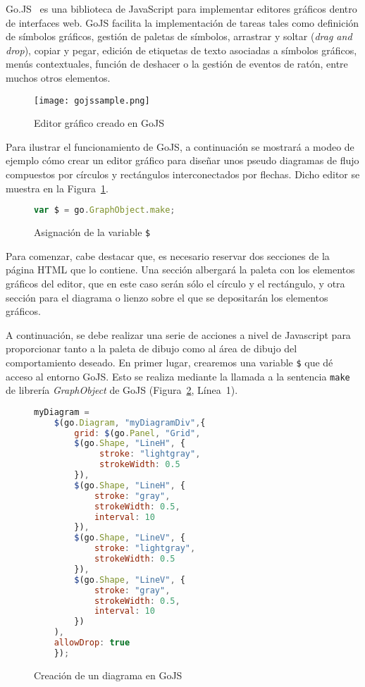 Go.JS~\cite{gojs} es una biblioteca de JavaScript para implementar editores gráficos dentro de interfaces web. GoJS facilita la implementación de tareas tales como definición de símbolos gráficos, gestión de paletas de símbolos, arrastrar y soltar (\emph{drag and drop}), copiar y pegar, edición de etiquetas de texto asociadas a símbolos gráficos, menús contextuales, función de deshacer o la gestión de eventos de ratón, entre muchos otros elementos.

\begin{figure}[H]
	\centering
	\texttt{[image: gojssample.png]}
	\caption{Editor gráfico creado en GoJS}
	\label{fig:gojssample}
\end{figure}

Para ilustrar el funcionamiento de GoJS, a continuación se mostrará a modeo de ejemplo cómo crear un editor gráfico para diseñar unos pseudo diagramas de flujo compuestos por círculos y rectángulos interconectados por flechas. Dicho editor se muestra en la Figura~\ref{fig:gojssample}.

\begin{figure}[H]
	\centering
	\begin{lstlisting}[language=JavaScript]
	var $ = go.GraphObject.make;\end{lstlisting}
	\caption{Asignación de la variable \texttt{\$}}
	\label{fig:asignacionDollar}
\end{figure}

Para comenzar, cabe destacar que, es necesario reservar dos secciones de la página HTML que lo contiene. Una sección albergará la paleta con los elementos gráficos del editor, que en este caso serán sólo el círculo y el rectángulo, y otra sección para el diagrama o lienzo sobre el que se depositarán los elementos gráficos.

A continuación, se debe realizar una serie de acciones a nivel de Javascript para proporcionar tanto a la paleta de dibujo como al área de dibujo del comportamiento deseado. En primer lugar, crearemos una variable \texttt{\$} que dé acceso al entorno GoJS. Esto se realiza mediante la llamada a la sentencia \texttt{make} de librería \emph{GraphObject} de GoJS (Figura~\ref{fig:asignacionDollar}, Línea~1).

\begin{figure}[H]
	\centering
	\begin{lstlisting}[language=JavaScript]
	myDiagram =
	$(go.Diagram, "myDiagramDiv",{
		grid: $(go.Panel, "Grid",
		$(go.Shape, "LineH", {
			 stroke: "lightgray",
			 strokeWidth: 0.5 
		}),
		$(go.Shape, "LineH", {
			stroke: "gray", 
			strokeWidth: 0.5, 
			interval: 10 
		}),
		$(go.Shape, "LineV", {
			stroke: "lightgray", 
			strokeWidth: 0.5 
		}),
		$(go.Shape, "LineV", {
			stroke: "gray", 
			strokeWidth: 0.5, 
			interval: 10 
		})
	),
	allowDrop: true
	});\end{lstlisting}
	\caption{Creación de un diagrama en GoJS}
	\label{fig:creacionDiagrama}
\end{figure}

